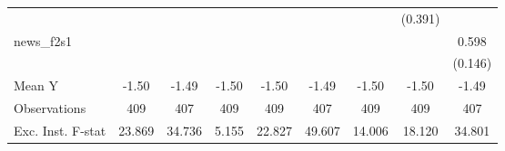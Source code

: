 {\begin{tabular}{l*{8}{c}}
            &                     &                     &                     &                     &                     &                     &     (0.391)         &                     \\
\addlinespace
news\_f2s1   &                     &                     &                     &                     &                     &                     &                     &       0.598\sym{***}\\
            &                     &                     &                     &                     &                     &                     &                     &     (0.146)         \\
\midrule
Mean Y      &       -1.50         &       -1.49         &       -1.50         &       -1.50         &       -1.49         &       -1.50         &       -1.50         &       -1.49         \\
Observations&         409         &         407         &         409         &         409         &         407         &         409         &         409         &         407         \\
Exc. Inst. F-stat&      23.869         &      34.736         &       5.155         &      22.827         &      49.607         &      14.006         &      18.120         &      34.801         \\
\bottomrule
\end{tabular}
}
